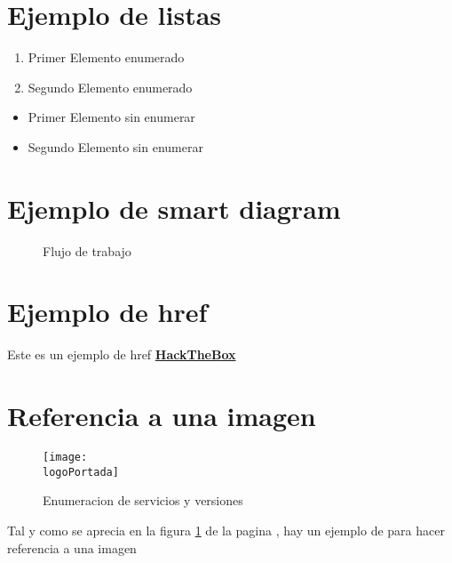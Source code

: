 \documentclass[a4paper]{article} %
\newcommand{\logoPortada}{~/.LaTexScript/HTB/HTBlogo.png}
\begin{document}
  \section{Ejemplo de listas} 

  \begin{enumerate}
    \item Primer Elemento enumerado
    \item Segundo Elemento enumerado
  \end{enumerate}


  \begin{itemize}
    \item Primer Elemento sin enumerar
    \item Segundo Elemento sin enumerar
  \end{itemize}


  \section{Ejemplo de smart diagram}


  \begin{figure}[h]
    \begin{center}
      \caption{Flujo de trabajo} 
    \end{center}
  \end{figure}

  \section{Ejemplo de href}

  Este es un ejemplo de href \href{https://tryhackme.com}{\textbf{\color{green}HackTheBox}}


  \section{Referencia a una imagen}
 
  \begin{figure}[h]
  \centering
    \texttt{[image: \\logoPortada]}
    \caption{Enumeracion de servicios y versiones}
    \label{fig:servicesResults}

  \end{figure}

  \vspace{0.2cm}

  Tal y como se aprecia en la figura \ref{fig:servicesResults} de la pagina
  \pageref{fig:servicesResults}, hay un ejemplo de para hacer referencia a una
  imagen
 

  \clearpage
\end{document}
